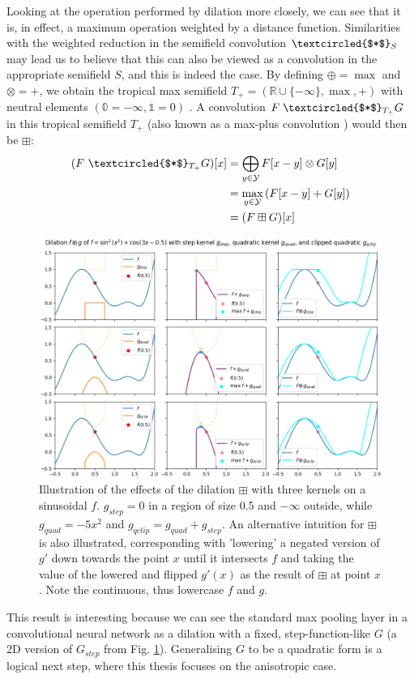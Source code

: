 \documentclass[a4paper, 12pt]{report}
\begin{document}
Looking at the operation performed by dilation more closely, we can see that it is, in effect, a maximum operation weighted by a distance function. Similarities with the weighted reduction in the semifield convolution $\textcircled{$*$}_S$ may lead us to believe that this can also be viewed as a convolution in the appropriate semifield $S$, and this is indeed the case. By defining $\oplus=\max$ and $\otimes=+$, we obtain the tropical max semifield $T_+=(\mathbb{R}\cup\{-\infty\},\max,+)$ with neutral elements $(\mathbb{0}=-\infty, \mathbb{1}=0)$ \cite{maragos, bellaardaxiomatic}. A convolution $F \;\textcircled{$*$}_{T_+} G$ in this tropical semifield $T_+$ (also known as a max-plus convolution \cite{maragos}) would then be $\boxplus$:
\begin{align}
	(F ~\textcircled{$*$}_{T_+} G)[x]
	&= \bigoplus_{y\in \mathcal{Y}}F[x-y] \otimes G[y] \\
	&= \max_{y\in \mathcal{Y}}\left(F[x-y] + G[y]\right) \\
	&= (F \boxplus G)[x]
\end{align}

\begin{figure}[h!]
  \includegraphics[width=\textwidth]{figures/dilation_illustration.png}
  \caption{Illustration of the effects of the dilation $\boxplus$ with three kernels on a sinusoidal $f$. $g_{step}=0$ in a region of size 0.5 and $-\infty$ outside, while $g_{quad}=-5x^2$ and $g_{qclip}=g_{quad}+g_{step}$. An alternative intuition for $\boxplus$ is also illustrated, corresponding with 'lowering' a negated version of $g'$ down towards the point $x$ until it intersects $f$ and taking the value of the lowered and flipped $g'(x)$ as the result of $\boxplus$ at point $x$. Note the continuous, thus lowercase $f$ and $g$.}
  \label{fig:dil-illust}
\end{figure}
\noindent
This result is interesting because we can see the standard max pooling layer in a convolutional neural network as a dilation with a fixed, step-function-like $G$ (a 2D version of $G_{step}$ from Fig. \ref{fig:dil-illust}). Generalising $G$ to be a quadratic form is a logical next step, where this thesis focuses on the anisotropic case.
\end{document}
